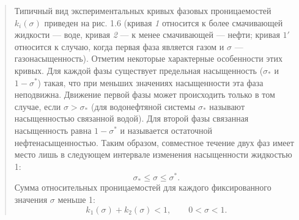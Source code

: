 \documentclass[12pt,a4paper]{article}
\begin{document}
\begin{quote}\sloppy
Типичный вид экспериментальных кривых фазовых проницаемостей $k_i(\sigma)$ приведен на рис. 1.6 (кривая \textit{1} относится к более смачивающей жидкости --- воде, кривая \textit{2} --- к менее смачивающей --- нефти; кривая $1'$ относится к случаю, когда первая фаза является газом и $\sigma$ --- газонасыщенность). Отметим некоторые характерные особенности этих кривых. Для каждой фазы существует предельная насыщенность ($\sigma_*$ и $1-\sigma^*$) такая, что при меньших значениях насыщенности эта фаза неподвижна. Движение первой фазы может происходить только в том случае, если $\sigma>\sigma_*$ (для водонефтяной системы $\sigma_*$ называют насыщенностью связанной водой). Для второй фазы связанная насыщенность равна $1-\sigma^*$ и называется остаточной нефтенасыщенностью. Таким образом, совместное течение двух фаз имеет место лишь в следующем интервале изменения насыщенности жидкостью 1:
\[\sigma_*\le\sigma\le\sigma^*.\]
Сумма относительных проницаемостей для каждого фиксированного значения $\sigma$ меньше 1:
\[k_1(\sigma)+k_2(\sigma)<1,\qquad0<\sigma<1.\]
\par\nobreak{}\par
\end{quote}
\end{document}
